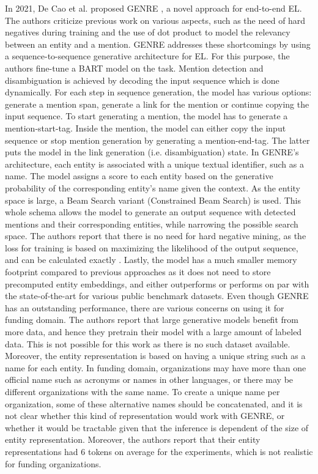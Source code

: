 \documentclass{report}
\theoremstyle{definition}
\theoremstyle{remark}
\begin{document}
In 2021, De Cao et al. proposed GENRE \cite{GENRE}, a novel approach for end-to-end EL. The authors criticize previous work on various aspects, such as the need of hard negatives during training and the use of dot product to model the relevancy between an entity and a mention. GENRE addresses these shortcomings by using a sequence-to-sequence generative architecture for EL. For this purpose, the authors fine-tune a BART \cite{bart} model on the task. Mention detection and disambiguation is achieved by decoding the input sequence which is done dynamically. For each step in sequence generation, the model has various options: generate a mention span, generate a link for the mention or continue copying the input sequence. To start generating a mention, the model has to generate a mention-start-tag. Inside the mention, the model can either copy the input sequence or stop mention generation by generating a mention-end-tag. The latter puts the model in the link generation (i.e. disambiguation) state. In GENRE's architecture, each entity is associated with a unique textual identifier, such as a name. The model assigns a score to each entity based on the generative probability of the corresponding entity's name given the context. As the entity space is large, a Beam Search \cite{beamsearch} variant (Constrained Beam Search) is used. This whole schema allows the model to generate an output sequence with detected mentions and their corresponding entities, while narrowing the possible search space. The authors report that there is no need for hard negative mining, as the loss for training is based on maximizing the likelihood of the output sequence, and can be calculated exactly \cite{GENRE}. Lastly, the model has a much smaller memory footprint compared to previous approaches as it does not need to store precomputed entity embeddings, and either outperforms or performs on par with the state-of-the-art for various public benchmark datasets. Even though GENRE has an outstanding performance, there are various concerns on using it for funding domain. The authors report that large generative models benefit from more data, and hence they pretrain their model with a large amount of labeled data. This is not possible for this work as there is no such dataset available. Moreover, the entity representation is based on having a unique string such as a name for each entity. In funding domain, organizations may have more than one official name such as acronyms or names in other languages, or there may be different organizations with the same name. To create a unique name per organization, some of these alternative names should be concatenated, and it is not clear whether this kind of representation would work with GENRE, or whether it would be tractable given that the inference is dependent of the size of entity representation. Moreover, the authors report that their entity representations had 6 tokens on average for the experiments, which is not realistic for funding organizations.
\end{document}
